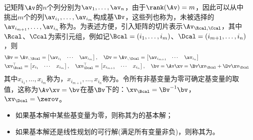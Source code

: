 \documentclass{ctexart}
\begin{document}
记矩阵$\Av$的$n$个列分别为$\av_1, \ldots, \av_n$，由于$\rank(\Av) = m$，因此可以从中挑出$m$个的列$\av_{i_1}, \ldots, \av_{i_m}$构成基$\Bv$，这些列也称为，未被选择的$\av_{i_{m+1}}, \ldots, \av_{i_n}$称为。为表述方便，引入矩阵的切片表示$\Av_{\Rcal,\Ccal}$，其中$\Rcal$、$\Ccal$为索引元组，例如记$\Bcal = (i_1, \ldots, i_m)$、$\Dcal = (i_{m+1}, \ldots, i_n)$，则
\begin{align*}
     & \Bv = \Av_{:,\Bcal} =
    \begin{bmatrix}
        \av_{i_1} & \cdots & \av_{i_m}
    \end{bmatrix}, \quad
    \Dv = \Av_{:,\Dcal} =
    \begin{bmatrix}
        \av_{i_{m+1}} & \cdots & \av_{i_n}
    \end{bmatrix}                                                                     \\
     & \xv_\Bcal^\top = \begin{bmatrix}
                            x_{i_1} & \cdots & x_{i_m}
                        \end{bmatrix}, \quad \xv_\Dcal^\top = \begin{bmatrix}
                                                                  x_{i_{m+1}} & \cdots & x_{i_n}
                                                              \end{bmatrix}, \quad \bv = \Av \xv = \Bv \xv_\Bcal + \Dv \xv_\Dcal
\end{align*}
其中$x_{i_1}, \ldots, x_{i_m}$称为，$x_{i_{m+1}}, \ldots, x_{i_n}$称为。令所有非基变量为零可确定基变量的取值，这称为$\Av \xv = \bv$在基$\Bv$下的：$\xv_\Bcal = \Bv^{-1} \bv$，$\xv_\Dcal = \zerov$。
\begin{itemize}
    \item 如果基本解中某些基变量为零，则称其为的基本解；
    \item 如果基本解还是线性规划的可行解(满足所有变量非负)，则称其为。
\end{itemize}
\end{document}
